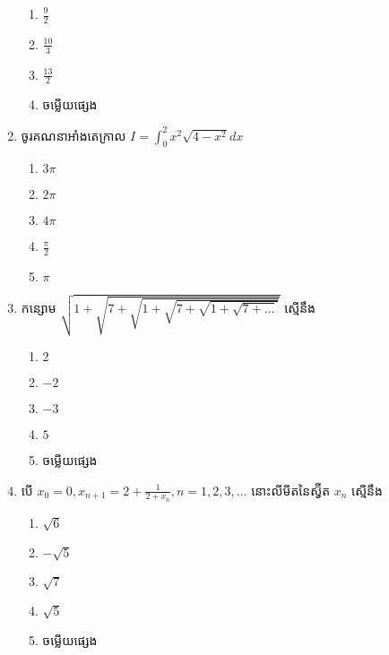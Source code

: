 \documentclass[12pt, a4paper]{article}
\begin{document}
\begin{enumerate}[m]
\begin{enumerate}[k,5]
		\item $\frac{9}{2}$
		\item $\frac{10}{3}$
		\item $\frac{13}{2}$
		\item ចម្លើយផ្សេង
	\end{enumerate}
	{\color{blue}\hrulefill}
	\item ចូរគណនាអាំងតេក្រាល $I=\int_{0}^{2}x^2\sqrt{4-x^2}dx$
	\begin{enumerate}[k,5]
		\item $3\pi$
		\item $2\pi$
		\item $4\pi$
		\item $\frac{\pi}{2}$
		\item $\pi$
	\end{enumerate}
	{\color{blue}\hrulefill}
	\item កន្សោម $\sqrt{1+\sqrt{7+\sqrt{1+\sqrt{7+\sqrt{1+\sqrt{7+\dots}}}}}}$ ស្មើនឹង 
	\begin{enumerate}[k,5]
		\item $2$
		\item $-2$
		\item $-3$
		\item $5$
		\item ចម្លើយផ្សេង
	\end{enumerate}
	{\color{blue}\hrulefill}
	\item បើ $x_0=0,x_{n+1}=2+\frac{1}{2+x_n}, n=1,2,3,\dots$ នោះលីមីតនៃស្វ៊ីត $x_n$ ស្មើនឹង
	\begin{enumerate}[k,5]
		\item $\sqrt{6}$
		\item $-\sqrt{5}$
		\item $\sqrt{7}$
		\item $\sqrt{5}$
		\item ចម្លើយផ្សេង
	\end{enumerate} 
	{\color{blue}\hrulefill}
\end{enumerate}
\makeads
\newpage
\maketitle\koc
{\color{blue}\hrulefill}
\end{document}
